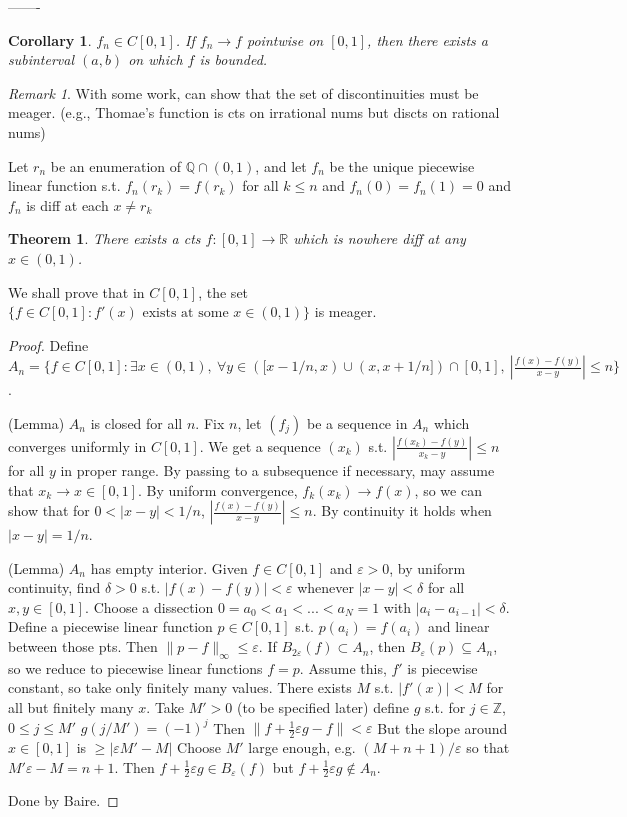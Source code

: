 \documentclass{article}
\newcommand{\e}{\varepsilon}
\theoremstyle{definition}
\theoremstyle{remark}
\newtheorem{rem}{Remark}
\theoremstyle{plain}
\newtheorem{thm}[defn]{Theorem}
\newtheorem{crly}[defn]{Corollary}
\newcommand{\ZZ}{\mathbb{Z}}
\newcommand{\QQ}{\mathbb{Q}}
\newcommand{\RR}{\mathbb{R}}
\begin{document}
-------

\begin{crly}
    $f_n\in C[0,1]$. If $f_n\to f$ pointwise on $[0,1]$, then there exists a subinterval $(a,b)$ on which $f$ is bounded.
\end{crly}
\begin{rem}
    With some work, can show that the set of discontinuities must be meager. (e.g., Thomae's function is cts on irrational nums but discts on rational nums) 

    Let $r_n$ be an enumeration of $\QQ\cap (0,1)$, and let $f_n$ be the unique piecewise linear function s.t. $f_n(r_k)=f(r_k)$ for all $k\le n$ and $f_n(0)=f_n(1)=0$ and $f_n$ is diff at each $x\neq r_k$
\end{rem}
\begin{thm}
    There exists a cts $f:[0,1]\to\RR$ which is nowhere diff at any $x\in(0,1)$.
\end{thm}
We shall prove that in $C[0,1]$, the set $\{f\in C[0,1]:f'(x)\text{ exists at some }x\in(0,1)\}$ is meager.
\begin{proof}
    Define $A_n=\{f\in C[0,1]:\exists x\in (0,1),\ \forall y\in ([x-1/n,x)\cup(x,x+1/n])\cap [0,1],\ |\frac{f(x)-f(y)}{x-y}|\le n\}$.

    (Lemma) $A_n$ is closed for all $n$. Fix $n$, let $(f_j)$ be a sequence in $A_n$ which converges uniformly in $C[0,1]$. We get a sequence $(x_k)$ s.t. $|\frac{f(x_k)-f(y)}{x_k-y}|\le n$ for all $y$ in proper range. By passing to a subsequence if necessary, may assume that $x_k\to x\in[0,1]$. By uniform convergence, $f_k(x_k)\to f(x)$, so we can show that for $0<|x-y|<1/n$, $|\frac{f(x)-f(y)}{x-y}|\le n$. By continuity it holds when $|x-y|=1/n$.

    (Lemma) $A_n$ has empty interior. Given $f\in C[0,1]$ and $\e>0$, by uniform continuity, find $\delta>0$ s.t. $|f(x)-f(y)|<\e$ whenever $|x-y|<\delta$ for all $x,y\in[0,1]$. Choose a dissection $0=a_0<a_1<...<a_N=1$ with $|a_i-a_{i-1}|<\delta$. Define a piecewise linear function $p\in C[0,1]$ s.t. $p(a_i)=f(a_i)$ and linear between those pts. Then $\|p-f\|_\infty\le\e$. If $B_{2\e}(f)\subset A_n$, then $B_\e(p)\subseteq A_n$, so we reduce to piecewise linear functions $f=p$. Assume this, $f'$ is piecewise constant, so take only finitely many values. There exists $M$ s.t. $|f'(x)|<M$ for all but finitely many $x$. Take $M'>0$ (to be specified later) define $g$ s.t. for $j\in\ZZ$, $0\le j\le M'$ $g(j/M')=(-1)^j$ Then $\|f+\frac12\e g-f\|<\e$ But the slope around $x\in[0,1]$ is $\ge |\e M'-M|$ Choose $M'$ large enough, e.g. $(M+n+1)/\e$ so that $M'\e-M=n+1$. Then $f+\frac12\e g\in B_\e(f)$ but $f+\frac12\e g\notin A_n$.

    Done by Baire.
\end{proof}
\end{document}
